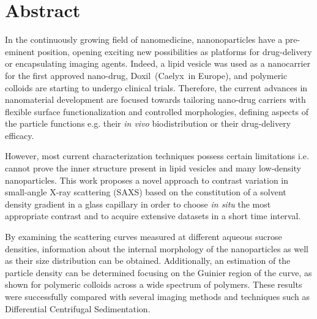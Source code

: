 \chapter*{Abstract}
\thispagestyle{empty}


In the continuously growing field of nanomedicine, nanonoparticles have a pre-eminent position, opening exciting new possibilities as platforms for drug-delivery or encapsulating imaging agents. Indeed, a lipid vesicle was used as a nanocarrier for the first approved nano-drug, Doxil\textregistered\ (Caelyx\textregistered\ in Europe), and polymeric colloids are starting to undergo clinical trials. Therefore, the current advances in nanomaterial development are focused towards tailoring nano-drug carriers with flexible surface functionalization and controlled morphologies, defining aspects of the particle functions e.g. their \emph{in vivo} biodistribution or their drug-delivery efficacy. 

However, most current characterization techniques possess certain limitations i.e. cannot prove the inner structure present in lipid vesicles and many low-density nanoparticles. This work proposes a novel approach to contrast variation in small-angle X-ray scattering (SAXS) based on the constitution of a solvent density gradient in a glass capillary in order to choose \emph{in situ} the most appropriate contrast and to acquire extensive datasets in a short time interval.


By examining the scattering curves measured at different aqueous sucrose densities, information about the internal morphology of the nanoparticles as well as their size distribution can be obtained. Additionally, an estimation of the particle density can be determined focusing on the Guinier region of the curve, as shown for polymeric colloids across a wide spectrum of polymers. These results were successfully compared with several imaging methods and techniques such as Differential Centrifugal Sedimentation.
 

